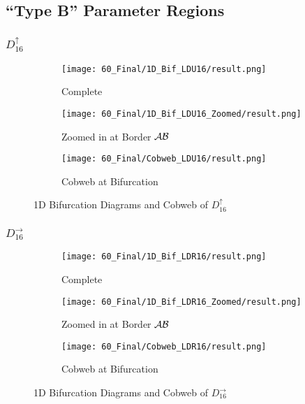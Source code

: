 \subsection{``Type B'' Parameter Regions}

\subsubsection{$D_{16}^\uparrow$}

\begin{figure}
    \centering
    \begin{subfigure}{0.3\textwidth}
        \centering
        \texttt{[image: 60\_Final/1D\_Bif\_LDU16/result.png]}
        \caption{Complete}
        \label{fig:final.bifurcation.D.up}
    \end{subfigure}
    \begin{subfigure}{0.3\textwidth}
        \centering
        \texttt{[image: 60\_Final/1D\_Bif\_LDU16\_Zoomed/result.png]}
        \caption{Zoomed in at Border $\mathcal{A}\mathcal{B}$}
        \label{fig:final.bifurcation.D.up.zoomed}
    \end{subfigure}
    \begin{subfigure}{0.3\textwidth}
        \centering
        \texttt{[image: 60\_Final/Cobweb\_LDU16/result.png]}
        \caption{Cobweb at Bifurcation}
        \label{fig:final.bifurcation.D.up.cobweb}
    \end{subfigure}
    \caption{1D Bifurcation Diagrams and Cobweb of $D_{16}^\uparrow$}
\end{figure}

\subsubsection{$D_{16}^\rightarrow$}

\begin{figure}
    \centering
    \begin{subfigure}{0.3\textwidth}
        \centering
        \texttt{[image: 60\_Final/1D\_Bif\_LDR16/result.png]}
        \caption{Complete}
        \label{fig:final.bifurcation.D.right}
    \end{subfigure}
    \begin{subfigure}{0.3\textwidth}
        \centering
        \texttt{[image: 60\_Final/1D\_Bif\_LDR16\_Zoomed/result.png]}
        \caption{Zoomed in at Border $\mathcal{A}\mathcal{B}$}
        \label{fig:final.bifurcation.D.right.zoomed}
    \end{subfigure}
    \begin{subfigure}{0.3\textwidth}
        \centering
        \texttt{[image: 60\_Final/Cobweb\_LDR16/result.png]}
        \caption{Cobweb at Bifurcation}
        \label{fig:final.bifurcation.D.right.cobweb}
    \end{subfigure}
    \caption{1D Bifurcation Diagrams and Cobweb of $D_{16}^\rightarrow$}
\end{figure}

